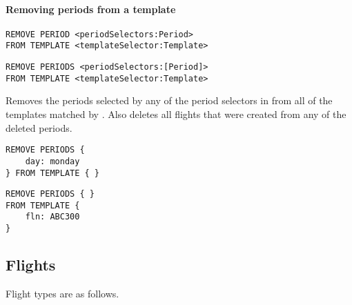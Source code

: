\paragraph{Removing periods from a template}
\begin{operation}
  \label{op:remove_periods}
  \begin{lstlisting}
REMOVE PERIOD <periodSelectors:Period>
FROM TEMPLATE <templateSelector:Template>
  \end{lstlisting}
\end{operation}
\begin{operation}
  \label{op:remove_periods}
  \begin{lstlisting}
REMOVE PERIODS <periodSelectors:[Period]>
FROM TEMPLATE <templateSelector:Template>
  \end{lstlisting}
\end{operation}
Removes the periods selected by any of the period selectors in
 from all of the templates matched by
. Also deletes all flights that were created from any of
the deleted periods.


\begin{texa}
  \begin{lstlisting}
REMOVE PERIODS {
    day: monday
} FROM TEMPLATE { }
  \end{lstlisting}
\end{texa}
\begin{texa}
  \begin{lstlisting}
REMOVE PERIODS { }
FROM TEMPLATE {
    fln: ABC300
}
  \end{lstlisting}
\end{texa}


\subsection{Flights}
Flight types are as follows.
